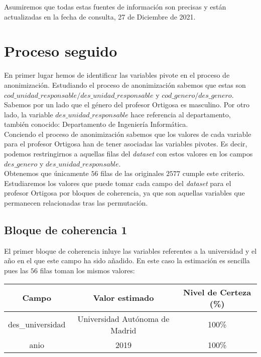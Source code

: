 \documentclass[a4paper]{article}
\begin{document}
Asumiremos que todas estas fuentes de información son precisas y están actualizadas en la fecha de consulta, 27 de Diciembre de 2021.

\section{Proceso seguido}

En primer lugar hemos de identificar las variables pivote en el proceso de anonimización. Estudiando el proceso de anonimización sabemos que estas son $cod\_unidad\_responsable / des\_unidad\_responsable$ y $cod\_genero / des\_genero$. Sabemos por un lado que el género del profesor Ortigosa es masculino. Por otro lado, la variable $des\_unidad\_responsable$ hace referencia al departamento, también conocido: Departamento de Ingeniería Informática. \\

Conciendo el proceso de anonimización sabemos que los valores de cada variable para el profesor Ortigosa han de tener asociadas las variables pivotes. Es decir, podemos restringirnos a aquellas filas del \emph{dataset} con estos valores en los campos $des\_genero$ y $des\_unidad\_responsable$. \\

Obtenemos que únicamente $56$ filas de las originales $2577$ cumple este criterio. Estudiaremos los valores que puede tomar cada campo del \emph{dataset} para el profesor Ortigosa por bloques de coherencia, ya que son aquellas variables que permanecen relacionadas tras las permutación.

\subsection{Bloque de coherencia 1}

El primer bloque de coherencia inluye las variables referentes a la universidad y el año en el que este campo ha sido añadido. En este caso la estimación es sencilla pues las $56$ filas toman los mismos valores:
 
\begin{table}[H]
	\centering
	\begin{tabular}{ccc}
		\textbf{Campo}   & \textbf{Valor estimado}        & \textbf{Nivel de Certeza (\%)} \\ \hline
		des\_universidad & Universidad Autónoma de Madrid & 100\%                          \\
		anio             & 2019                           & 100\%                         
	\end{tabular}
\end{table}
\end{document}
